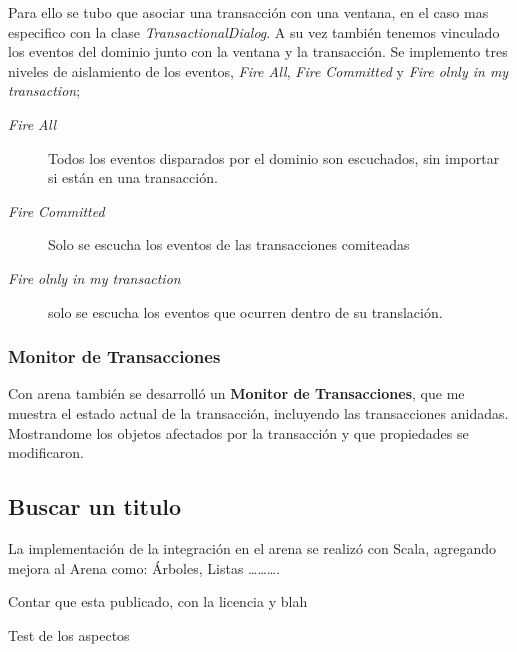 	Para ello se tubo que asociar una transacción con una ventana, en el caso mas
	especifico con la clase \emph{TransactionalDialog}. A su vez también tenemos
	vinculado los eventos del dominio junto con la ventana y la transacción.
	Se implemento tres niveles de aislamiento de los eventos,  \emph{Fire All},
	\emph{Fire Committed} y \emph{Fire olnly in my transaction};
	
	\begin{description}
		\item[\emph{Fire All}] Todos los eventos disparados por el dominio son
		escuchados, sin importar si están en una transacción.
	
		\item[\emph{Fire Committed}] Solo se escucha los eventos de las transacciones
			comiteadas
		
		\item[\emph{Fire olnly in my transaction}] solo se escucha los eventos que
			ocurren dentro de su translación.
	
	 \end{description}
	 
	 \medskip
	 
	\subsubsection{Monitor de Transacciones}
	
	 Con arena también se desarrolló un {\bf Monitor de Transacciones}, que me
	 muestra el estado actual de la transacción, incluyendo las transacciones
	 anidadas. Mostrandome los objetos afectados por la transacción y que
	 propiedades se modificaron.
	 
	 
 

	
\subsection{Buscar un  titulo}
La implementación de la integración en el arena se realizó con Scala, agregando
mejora al Arena como: Árboles, Listas \ldots \ldots \ldots. 
	
	
Contar que esta publicado, con la licencia y blah

Test de los aspectos


